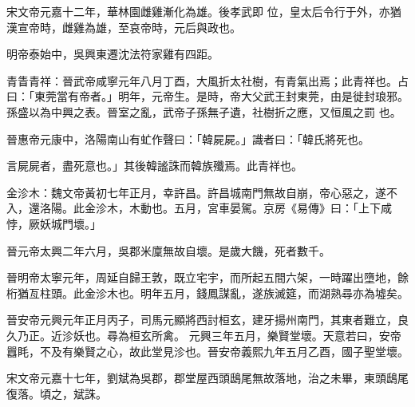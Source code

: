 \begin{pinyinscope}
 宋文帝元嘉十二年，華林園雌雞漸化為雄。後孝武即
 位，皇太后令行于外，亦猶漢宣帝時，雌雞為雄，至哀帝時，元后與政也。



 明帝泰始中，吳興東遷沈法符家雞有四距。



 青眚青祥：晉武帝咸寧元年八月丁酉，大風折太社樹，有青氣出焉；此青祥也。占曰：「東莞當有帝者。」明年，元帝生。是時，帝大父武王封東莞，由是徙封琅邪。孫盛以為中興之表。晉室之亂，武帝子孫無孑遺，社樹折之應，又恒風之罰
 也。



 晉惠帝元康中，洛陽南山有虻作聲曰：「韓屍屍。」識者曰：「韓氏將死也。



 言屍屍者，盡死意也。」其後韓謐誅而韓族殲焉。此青祥也。



 金沴木：魏文帝黃初七年正月，幸許昌。許昌城南門無故自崩，帝心惡之，遂不入，還洛陽。此金沴木，木動也。五月，宮車晏駕。京房《易傳》曰：「上下咸悖，厥妖城門壞。」



 晉元帝太興二年六月，吳郡米廩無故自壞。是歲大饑，死者數千。



 晉明帝太寧元年，周延自歸王敦，既立宅宇，而所起五間六架，一時躍出墮地，餘桁猶亙柱頭。此金沴木也。明年五月，錢鳳謀亂，遂族滅筵，而湖熟尋亦為墟矣。



 晉安帝元興元年正月丙子，司馬元顯將西討桓玄，建牙揚州南門，其東者難立，良久乃正。近沴妖也。尋為桓玄所禽。
 元興三年五月，樂賢堂壞。天意若曰，安帝囂眊，不及有樂賢之心，故此堂見沴也。晉安帝義熙九年五月乙酉，國子聖堂壞。



 宋文帝元嘉十七年，劉斌為吳郡，郡堂屋西頭鴟尾無故落地，治之未畢，東頭鴟尾復落。頃之，斌誅。



\end{pinyinscope}
